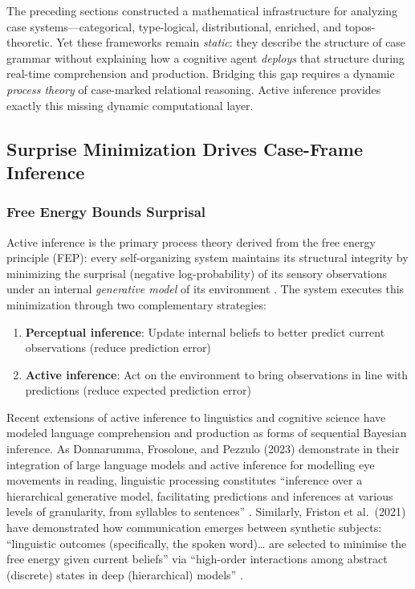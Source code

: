 \documentclass[
]{article}
\providecommand{\tightlist}{%
  \setlength{\itemsep}{0pt}\setlength{\parskip}{0pt}}
\begin{document}
The preceding sections constructed a mathematical infrastructure for
analyzing case systems---categorical, type-logical, distributional,
enriched, and topos-theoretic. Yet these frameworks remain
\emph{static}: they describe the structure of case grammar without
explaining how a cognitive agent \emph{deploys} that structure during
real-time comprehension and production. Bridging this gap requires a
dynamic \emph{process theory} of case-marked relational reasoning.
Active inference \citep{namjoshi2026fundamentals, friston2017active}
provides exactly this missing dynamic computational layer.

\subsection{Surprise Minimization Drives Case-Frame
Inference}\label{surprise-minimization-drives-case-frame-inference}

\subsubsection{Free Energy Bounds
Surprisal}\label{free-energy-bounds-surprisal}

Active inference is the primary process theory derived from the free
energy principle (FEP): every self-organizing system maintains its
structural integrity by minimizing the surprisal (negative
log-probability) of its sensory observations under an internal
\emph{generative model} of its environment
\citeyearpar{friston2010free}. The system executes this minimization
through two complementary strategies:

\begin{enumerate}
\def\labelenumi{\arabic{enumi}.}
\tightlist
\item
  \textbf{Perceptual inference}: Update internal beliefs to better
  predict current observations (reduce prediction error)
\item
  \textbf{Active inference}: Act on the environment to bring
  observations in line with predictions (reduce expected prediction
  error)
\end{enumerate}

Recent extensions of active inference to linguistics and cognitive
science have modeled language comprehension and production as forms of
sequential Bayesian inference. As Donnarumma, Frosolone, and Pezzulo
(2023) demonstrate in their integration of large language models and
active inference for modelling eye movements in reading, linguistic
processing constitutes ``inference over a hierarchical generative model,
facilitating predictions and inferences at various levels of
granularity, from syllables to sentences''
\citeyearpar{donnarumma2023integrating}. Similarly, Friston et
al.~(2021) have demonstrated how communication emerges between synthetic
subjects: ``linguistic outcomes (specifically, the spoken word)\ldots{}
are selected to minimise the free energy given current beliefs'' via
``high-order interactions among abstract (discrete) states in deep
(hierarchical) models''
\citetext{\citeyear{friston2021understanding}; \citeyear{friston2020generative}}.
\end{document}
